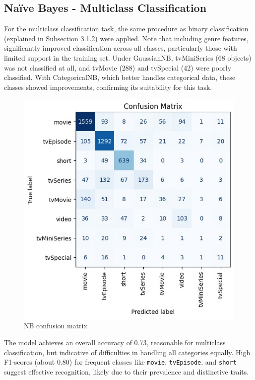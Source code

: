 \subsection{Naïve Bayes - Multiclass Classification} 
For the multiclass classification task, the same procedure as binary classification (explained in Subsection 3.1.2) were applied. 
Note that including genre features, significantly improved classification across all classes, particularly those with limited support in the training set. 
Under GaussianNB, tvMiniSeries (68 objects) was not classified at all, and tvMovie (288) and tvSpecial (42) were poorly classified. 
With CategoricalNB, which better handles categorical data, these classes showed improvements, confirming its suitability for this task.\\   
\begin{figure}
    \centering
    \captionsetup{justification=raggedleft, width=1\linewidth}
    \caption{NB confusion matrix}
    \label{fig:nb_multiclass}
    \includegraphics[width=0.9\linewidth]{plots/nb_multiclass_confmatrix.jpg}
\end{figure}
The model achieves an overall accuracy of 0.73, reasonable for multiclass classification, but indicative of difficulties in handling all categories equally. 
High F1-scores (about 0.80) for frequent classes like \texttt{movie}, \texttt{tvEpisode}, and \texttt{short} suggest effective recognition, likely due to their prevalence and distinctive traits. 

